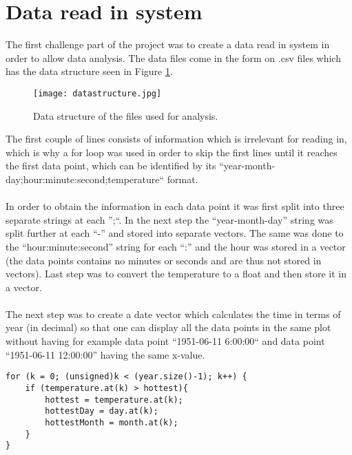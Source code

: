 \documentclass[../main.tex]{subfiles}
\begin{document}
\section{Data read in system}
	The first challenge part of the project was to create a data read in system in order to allow data analysis. The data files come in the form on .csv files which has
	the data structure seen in Figure \ref{datastructure}.
	\begin{figure}[!h]
	  \centering
	  \texttt{[image: datastructure.jpg]}
	  \caption{Data structure of the files used for analysis.}
	  \label{datastructure}
	 
	\end{figure}\noindent
	The first couple of lines consists of information which is irrelevant for reading in, which is why a for loop was used in order to skip the first lines until it reaches 
	the first data point, which can be identified by its ``year-month-day;hour:minute:second;temperature`` format.
	\\\\
	In order to obtain the information in each data point it was first split into three separate strings at each '';``. In the next step the ``year-month-day'' string was split 
	further at each ``-'' and stored into separate vectors. The same was done to the ``hour:minute:second'' string for each ``:'' and the hour was stored in a 
	vector (the data points contains no minutes or seconds and are thus not stored in vectors). Last step was to convert the temperature to a float and then store it in a vector. 
	\\\\
	The next step was to create a date vector which calculates the time in terms of year (in decimal) so that one can display all the data points in the same plot without having 
	for example data point ``1951-06-11 6:00:00`` and data point ``1951-06-11 12:00:00'' having the same x-value.
	

	\vspace{2mm}
	\begin{lstlisting}[frame=single] 
for (k = 0; (unsigned)k < (year.size()-1); k++) { 
	if (temperature.at(k) > hottest){ 
		hottest = temperature.at(k);
		hottestDay = day.at(k);
		hottestMonth = month.at(k);
	}
}
	\end{lstlisting}
\end{document}
